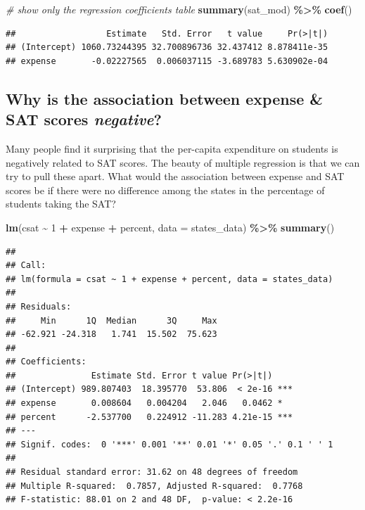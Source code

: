 \documentclass[
]{book}
\newenvironment{Shaded}{\begin{snugshade}}{\end{snugshade}}
\newcommand{\CommentTok}[1]{\textcolor[rgb]{0.56,0.35,0.01}{\textit{#1}}}
\newcommand{\DataTypeTok}[1]{\textcolor[rgb]{0.13,0.29,0.53}{#1}}
\newcommand{\DecValTok}[1]{\textcolor[rgb]{0.00,0.00,0.81}{#1}}
\newcommand{\KeywordTok}[1]{\textcolor[rgb]{0.13,0.29,0.53}{\textbf{#1}}}
\newcommand{\NormalTok}[1]{#1}
\newcommand{\OperatorTok}[1]{\textcolor[rgb]{0.81,0.36,0.00}{\textbf{#1}}}
\newcommand{\StringTok}[1]{\textcolor[rgb]{0.31,0.60,0.02}{#1}}
\begin{document}
\begin{Shaded}
\begin{Highlighting}[]
  \CommentTok{\# show only the regression coefficients table }
  \KeywordTok{summary}\NormalTok{(sat\_mod) }\OperatorTok{\%\textgreater{}\%}\StringTok{ }\KeywordTok{coef}\NormalTok{() }
\end{Highlighting}
\end{Shaded}

\begin{verbatim}
##                  Estimate   Std. Error   t value     Pr(>|t|)
## (Intercept) 1060.73244395 32.700896736 32.437412 8.878411e-35
## expense       -0.02227565  0.006037115 -3.689783 5.630902e-04
\end{verbatim}

\hypertarget{why-is-the-association-between-expense-sat-scores-negative}{%
\subsection{\texorpdfstring{Why is the association between expense \& SAT scores \emph{negative}?}{Why is the association between expense \& SAT scores negative?}}\label{why-is-the-association-between-expense-sat-scores-negative}}

Many people find it surprising that the per-capita expenditure on students is negatively related to SAT scores. The beauty of multiple regression is that we can try to pull these apart. What would the association between expense and SAT scores be if there were no difference among the states in the percentage of students taking the SAT?

\begin{Shaded}
\begin{Highlighting}[]
  \KeywordTok{lm}\NormalTok{(csat }\OperatorTok{\textasciitilde{}}\StringTok{ }\DecValTok{1} \OperatorTok{+}\StringTok{ }\NormalTok{expense }\OperatorTok{+}\StringTok{ }\NormalTok{percent, }\DataTypeTok{data =}\NormalTok{ states\_data) }\OperatorTok{\%\textgreater{}\%}\StringTok{ }
\StringTok{  }\KeywordTok{summary}\NormalTok{() }
\end{Highlighting}
\end{Shaded}

\begin{verbatim}
## 
## Call:
## lm(formula = csat ~ 1 + expense + percent, data = states_data)
## 
## Residuals:
##     Min      1Q  Median      3Q     Max 
## -62.921 -24.318   1.741  15.502  75.623 
## 
## Coefficients:
##               Estimate Std. Error t value Pr(>|t|)    
## (Intercept) 989.807403  18.395770  53.806  < 2e-16 ***
## expense       0.008604   0.004204   2.046   0.0462 *  
## percent      -2.537700   0.224912 -11.283 4.21e-15 ***
## ---
## Signif. codes:  0 '***' 0.001 '**' 0.01 '*' 0.05 '.' 0.1 ' ' 1
## 
## Residual standard error: 31.62 on 48 degrees of freedom
## Multiple R-squared:  0.7857, Adjusted R-squared:  0.7768 
## F-statistic: 88.01 on 2 and 48 DF,  p-value: < 2.2e-16
\end{verbatim}
\end{document}
